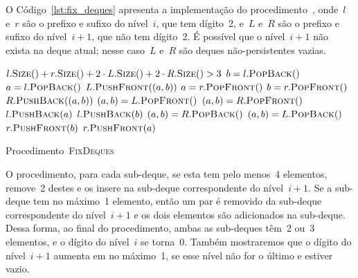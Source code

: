 \documentclass[main.tex]{subfiles}
\begin{document}
O Código~\ref{lst:fix_deques} apresenta a implementação do procedimento~, onde~$l$ e~$r$ são o prefixo e sufixo do nível~$i$, que tem dígito~2, e~$L$ e~$R$ são o prefixo e sufixo do nível~$i+1$, que não tem dígito~2. É possível que o nível~$i+1$ não exista na deque atual; nesse caso~$L$ e~$R$ são deques não-persistentes vazias.

\begin{algorithm}
\begin{algorithmic}[1]

\Require $l.\Call{Size}{\null} + r.\Call{Size}{\null} + 2\cdot L.\Call{Size}{\null} + 2\cdot R.\Call{Size}{\null} > 3$
     \label{line:fd:if5}
        \State $b = {l}.\Call{PopBack}{\null}$
        \State $a = {l}.\Call{PopBack}{\null}$
        \State ${L}.\Call{PushFront}{(a, b)}$
    \EndIf
     \label{line:fd:if6}
        \State $a = {r}.\Call{PopFront}{\null}$
        \State $b = {r}.\Call{PopFront}{\null}$
        \State ${R}.\Call{PushBack}{(a, b)}$
    \EndIf
     \label{line:fd:if3}
         \label{line:fd:if1}
            \State $(a, b) = {L}.\Call{PopFront}{\null}$
        \Else
            \State $(a, b) = {R}.\Call{PopFront}{\null}$
        \EndIf
        \State ${l}.\Call{PushBack}{a}$
        \State ${l}.\Call{PushBack}{b}$
    \EndIf
     \label{line:fd:if4}
         \label{line:fd:if2}
            \State $(a, b) = {R}.\Call{PopBack}{\null}$
        \Else
            \State $(a, b) = {L}.\Call{PopBack}{\null}$
        \EndIf
        \State ${r}.\Call{PushFront}{b}$
        \State ${r}.\Call{PushFront}{a}$
    \EndIf
\EndProcedure

\end{algorithmic}
\caption{Procedimento~\textsc{FixDeques}} \label{lst:fix_deques}
\end{algorithm}

O procedimento, para cada sub-deque, se esta tem pelo menos~4 elementos, remove~2 destes e os insere na sub-deque correspondente do nível~$i+1$. Se a sub-deque tem no máximo~1 elemento, então um par é removido da sub-deque correspondente do nível~$i+1$ e os dois elementos são adicionados na sub-deque. Dessa forma, ao final do procedimento, ambas as sub-deques têm~2 ou~3 elementos, e o dígito do nível~$i$ se torna~0. Também mostraremos que o dígito do nível~$i+1$ aumenta em no máximo~1, se esse nível não for o último e estiver vazio.
\end{document}
